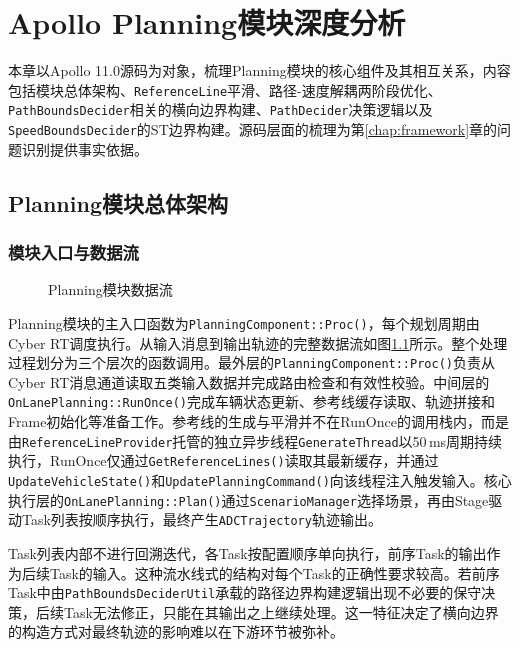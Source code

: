 \chapter{Apollo Planning模块深度分析}
\label{chap:apollo_planning}

本章以Apollo 11.0源码为对象，梳理Planning模块的核心组件及其相互关系，内容包括模块总体架构、\texttt{ReferenceLine}平滑、路径-速度解耦两阶段优化、\texttt{PathBoundsDecider}相关的横向边界构建、\texttt{PathDecider}决策逻辑以及\texttt{SpeedBoundsDecider}的ST边界构建。源码层面的梳理为第\ref{chap:framework}章的问题识别提供事实依据。

\section{Planning模块总体架构}

\subsection{模块入口与数据流}

\begin{figure}[htbp]
\centering
{}
\caption{Planning模块数据流}
\label{fig:planning_flow}
\end{figure}

Planning模块的主入口函数为\texttt{PlanningComponent::Proc()}，每个规划周期由Cyber RT调度执行。从输入消息到输出轨迹的完整数据流如图\ref{fig:planning_flow}所示。整个处理过程划分为三个层次的函数调用。最外层的\texttt{PlanningComponent::Proc()}负责从Cyber RT消息通道读取五类输入数据并完成路由检查和有效性校验。中间层的\texttt{OnLanePlanning::RunOnce()}完成车辆状态更新、参考线缓存读取、轨迹拼接和Frame初始化等准备工作。参考线的生成与平滑并不在RunOnce的调用栈内，而是由\texttt{ReferenceLineProvider}托管的独立异步线程\texttt{GenerateThread}以50\,ms周期持续执行，RunOnce仅通过\texttt{GetReferenceLines()}读取其最新缓存，并通过\texttt{UpdateVehicleState()}和\texttt{UpdatePlanningCommand()}向该线程注入触发输入。核心执行层的\texttt{OnLanePlanning::Plan()}通过\texttt{ScenarioManager}选择场景，再由Stage驱动Task列表按顺序执行，最终产生\texttt{ADCTrajectory}轨迹输出。

Task列表内部不进行回溯迭代，各Task按配置顺序单向执行，前序Task的输出作为后续Task的输入。这种流水线式的结构对每个Task的正确性要求较高。若前序Task中由\texttt{PathBoundsDeciderUtil}承载的路径边界构建逻辑出现不必要的保守决策，后续Task无法修正，只能在其输出之上继续处理。这一特征决定了横向边界的构造方式对最终轨迹的影响难以在下游环节被弥补。

